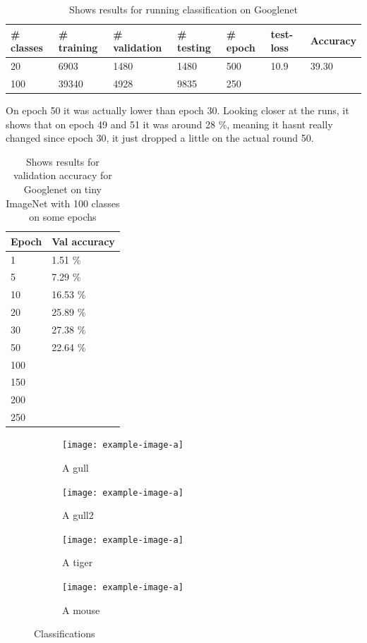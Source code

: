 \documentclass[twoside,11pt]{article}
\begin{document}
\begin{table}[!htbp]
  \centering
\caption{\label{tab:results} Shows results for running classification on Googlenet}
\begin{tabular}{| l l l l l l l|}
  \hline
  \# classes & \# training & \# validation & \# testing & \# epoch & test-loss & Accuracy\\ \hline
  20 & 6903 & 1480 & 1480 & 500 & 10.9 & 39.30 \\
  100 & 39340 & 4928 & 9835 & 250 & & \\
  \hline  
\end{tabular}
\end{table}

On epoch 50 it was actually lower than epoch 30. Looking closer at the runs, it shows that on epoch 49 and 51 it was around 28 \%, meaning it hasnt really changed since epoch 30, it just dropped a little on the actual round 50. 

\begin{table}[!htbp]
  \centering
\caption{\label{tab:results} Shows results for validation accuracy for Googlenet on tiny ImageNet with 100 classes on some epochs}
\begin{tabular}{| l l |}
  \hline
  Epoch & Val accuracy \\ \hline
  1 & 1.51 \%\\
  5 & 7.29 \%\\
  10 & 16.53 \%\\
  20 & 25.89 \%\\
  30 & 27.38 \%\\
  50 & 22.64 \%\\
  100 & \\
  150 & \\
  200 & \\
  250 & \\
  \hline  
\end{tabular}
\end{table}


\begin{figure}[!htbp]
        \begin{subfigure}[b]{0.25\textwidth}
                \texttt{[image: example-image-a]}
                \caption{A gull}
                \label{fig:gull}
        \end{subfigure}%
        \begin{subfigure}[b]{0.25\textwidth}
                \texttt{[image: example-image-a]}
                \caption{A gull2}
                \label{fig:gull2}
        \end{subfigure}%
        \begin{subfigure}[b]{0.25\textwidth}
                \texttt{[image: example-image-a]}
                \caption{A tiger}
                \label{fig:tiger}
        \end{subfigure}%
        \begin{subfigure}[b]{0.25\textwidth}
                \texttt{[image: example-image-a]}
                \caption{A mouse}
                \label{fig:mouse}
        \end{subfigure}
        \caption{Classifications}\label{fig:animals}
\end{figure}
\end{document}
